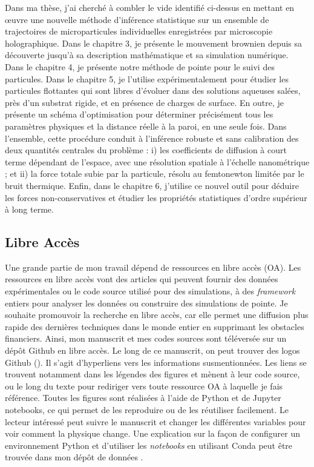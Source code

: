 Dans ma thèse, j'ai cherché à combler le vide identifié ci-dessus en mettant en œuvre une nouvelle méthode d'inférence statistique sur un ensemble de trajectoires de microparticules individuelles enregistrées par microscopie holographique. Dans le chapitre 3, je présente le mouvement brownien depuis sa découverte jusqu'à sa description mathématique et sa simulation numérique. Dans le chapitre 4, je présente notre méthode de pointe pour le suivi des particules. Dans le chapitre 5, je l'utilise expérimentalement pour étudier les particules flottantes qui sont libres d'évoluer dans des solutions aqueuses salées, près d'un substrat rigide, et en présence de charges de surface. En outre, je présente un schéma d'optimisation pour déterminer précisément tous les paramètres physiques et la distance réelle à la paroi, en une seule fois. Dans l'ensemble, cette procédure conduit à l'inférence robuste et sans calibration des deux quantités centrales du problème : i) les coefficients de diffusion à court terme dépendant de l'espace, avec une résolution spatiale à l'échelle nanométrique ; et ii) la force totale subie par la particule, résolu au femtonewton limitée par le bruit thermique. Enfin, dans le chapitre 6, j'utilise ce nouvel outil pour déduire les forces non-conservatives et étudier les propriétés statistiques d'ordre supérieur à long terme.




\subsection{Libre Accès}

Une grande partie de mon travail dépend de ressources en libre accès (OA). Les ressources en libre accès vont des articles qui peuvent fournir des données expérimentales ou le code source utilisé pour des simulations, à des \textit{framework} entiers pour analyser les données ou construire des simulations de pointe. Je souhaite promouvoir la recherche en libre accès, car elle permet une diffusion plus rapide des dernières techniques dans le monde entier en supprimant les obstacles financiers. Ainsi, mon manuscrit et mes codes sources sont téléversée sur un dépôt Github en libre accès. Le long de ce manuscrit, on peut trouver des logos Github (\href{https://github.com/eXpensia/Ma-these/}{\faGithub}). Il s'agit d'hyperliens vers les informations susmentionnées. Les liens se trouvent notamment dans les légendes des figures et mènent à leur code source, ou le long du texte pour rediriger vers toute ressource OA à laquelle je fais référence. Toutes les figures sont réalisées à l'aide de Python et de Jupyter notebooks, ce qui permet de les reproduire ou de les réutiliser facilement. Le lecteur intéressé peut suivre le manuscrit et changer les différentes variables pour voir comment la physique change.  Une explication sur la façon de configurer un environnement Python et d'utiliser les \textit{notebooks} en utilisant Conda peut être trouvée dans mon dépôt de données \href{https://github.com/eXpensia/Ma-these/}{\faGithub}.



